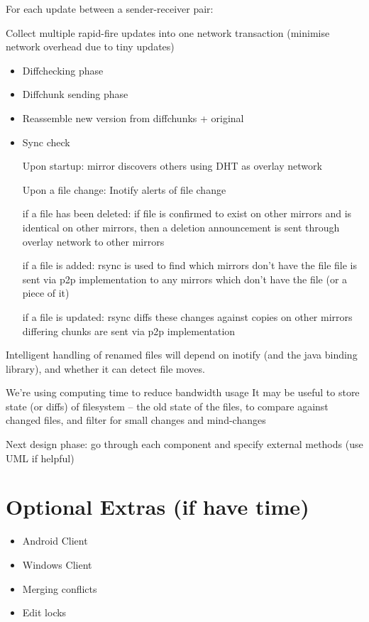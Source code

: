 \documentclass[12pt,a4paper,]{adreport}
\begin{document}
For each update between a sender-receiver pair:

Collect multiple rapid-fire updates into one network transaction
(minimise network overhead due to tiny updates)

\begin{itemize}
\item
  Diffchecking phase
\item
  Diffchunk sending phase
\item
  Reassemble new version from diffchunks + original
\item
  Sync check

  Upon startup: mirror discovers others using DHT as overlay network

  Upon a file change: Inotify alerts of file change

  if a file has been deleted: if file is confirmed to exist on other
  mirrors and is identical on other mirrors, then a deletion
  announcement is sent through overlay network to other mirrors

  if a file is added: rsync is used to find which mirrors don't have the
  file file is sent via p2p implementation to any mirrors which don't
  have the file (or a piece of it)

  if a file is updated: rsync diffs these changes against copies on
  other mirrors differing chunks are sent via p2p implementation
\end{itemize}

Intelligent handling of renamed files will depend on inotify (and the
java binding library), and whether it can detect file moves.

We're using computing time to reduce bandwidth usage It may be useful to
store state (or diffs) of filesystem -- the old state of the files, to
compare against changed files, and filter for small changes and
mind-changes

Next design phase: go through each component and specify external
methods (use UML if helpful)

\chapter{Optional Extras (if have
time)}\label{optional-extras-if-have-time}

\begin{itemize}
\itemsep1pt\parskip0pt
\item
  Android Client
\item
  Windows Client
\item
  Merging conflicts
\item
  Edit locks
\end{itemize}
\end{document}
